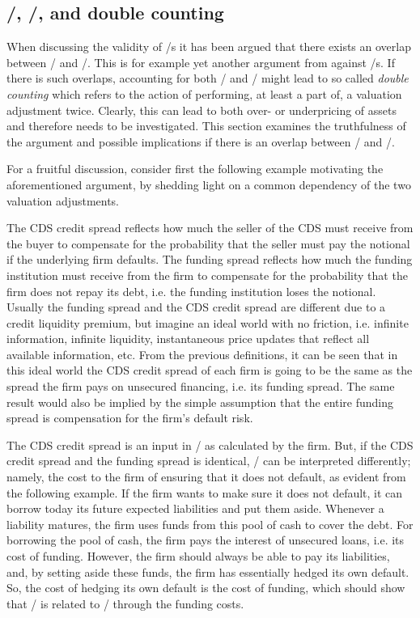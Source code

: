 \documentclass[main.tex]{subfiles}
\begin{document}
    \subsection{\FVA/, \DVA/, and double counting}
    \label{sec:fva-dva-double-counting}

    When discussing the validity of \FVA/s it has been argued
    that there exists an overlap between \FVA/ and \DVA/.
    This is for example yet another argument from \textcite{HullWhite2012FVA} against \FVA/s.
    If there is such overlaps, accounting for both \FVA/ and \DVA/
    might lead to so called \textit{double counting}
    which refers to the action of performing, at least a part of, a valuation adjustment twice. 
    Clearly, this can lead to both over- or underpricing of assets
    and therefore needs to be investigated.
    This section examines the truthfulness of the argument and possible implications 
    if there is an overlap between \FVA/ and \DVA/.

    For a fruitful discussion, 
    consider first the following example motivating the aforementioned argument,
    by shedding light on a common dependency of the two valuation adjustments.

    The CDS credit spread reflects how much the seller of the CDS must receive from the buyer
    to compensate for the probability that the seller must pay the notional 
    if the underlying firm defaults.
    The funding spread reflects how much the funding institution must receive from the firm 
    to compensate for the probability that the firm does not repay its debt, 
    i.e. the funding institution loses the notional.
    Usually the funding spread and the CDS credit spread 
    are different due to a credit liquidity premium,
    but imagine an ideal world with no friction, i.e. infinite information, infinite liquidity, 
    instantaneous price updates that reflect all available information, etc.
    From the previous definitions, it can be seen that in this ideal world
    the CDS credit spread of each firm is going to be the same 
    as the spread the firm pays on unsecured financing, i.e. its funding spread.
    The same result would also be implied by the simple assumption 
    that the entire funding spread is compensation for the firm's default risk.

    The CDS credit spread is an input in \DVA/ as calculated by the firm.
    But, if the CDS credit spread and the funding spread is identical, 
    \DVA/ can be interpreted differently;
    namely, the cost to the firm of ensuring that it does not default, 
    as evident from the following example.
    If the firm wants to make sure it does not default,
    it can borrow today its future expected liabilities and put them aside.
    Whenever a liability matures, the firm uses funds from this pool of cash to cover the debt.
    For borrowing the pool of cash, the firm pays the interest of unsecured loans, 
    i.e. its cost of funding.
    However, the firm should always be able to pay its liabilities,
    and, by setting aside these funds, the firm has essentially hedged its own default. 
    So, the cost of hedging its own default is the cost of funding, 
    which should show that \DVA/ is related to \FVA/ through the funding costs.
    
\end{document}
